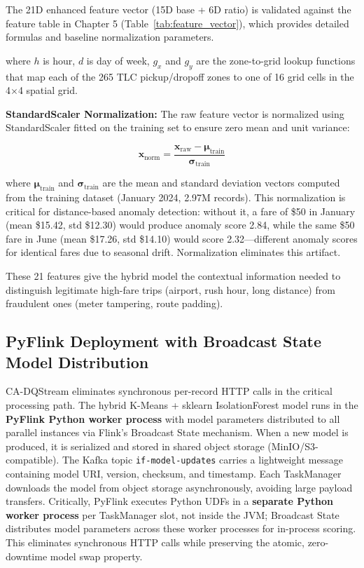 The 21D enhanced feature vector (15D base + 6D ratio) is validated against the feature table in Chapter 5 (Table~\ref{tab:feature_vector}), which provides detailed formulas and baseline normalization parameters.

where $h$ is hour, $d$ is day of week, $g_x$ and $g_y$ are the zone-to-grid lookup functions that map each of the 265 TLC pickup/dropoff zones to one of 16 grid cells in the 4$\times$4 spatial grid.

\textbf{StandardScaler Normalization:} The raw feature vector is normalized using StandardScaler fitted on the training set to ensure zero mean and unit variance:

\begin{equation}
\mathbf{x}_{\text{norm}} = \frac{\mathbf{x}_{\text{raw}} - \boldsymbol{\mu}_{\text{train}}}{\boldsymbol{\sigma}_{\text{train}}}
\end{equation}

where $\boldsymbol{\mu}_{\text{train}}$ and $\boldsymbol{\sigma}_{\text{train}}$ are the mean and standard deviation vectors computed from the training dataset (January 2024, 2.97M records). This normalization is critical for distance-based anomaly detection: without it, a fare of \$50 in January (mean \$15.42, std \$12.30) would produce anomaly score 2.84, while the same \$50 fare in June (mean \$17.26, std \$14.10) would score 2.32---different anomaly scores for identical fares due to seasonal drift. Normalization eliminates this artifact.

These 21 features give the hybrid model the contextual information needed to distinguish legitimate high-fare trips (airport, rush hour, long distance) from fraudulent ones (meter tampering, route padding).

\subsection{PyFlink Deployment with Broadcast State Model Distribution}

CA-DQStream eliminates synchronous per-record HTTP calls in the critical processing path. The hybrid K-Means + sklearn IsolationForest model runs in the \textbf{PyFlink Python worker process} with model parameters distributed to all parallel instances via Flink's Broadcast State mechanism. When a new model is produced, it is serialized and stored in shared object storage (MinIO/S3-compatible). The Kafka topic \texttt{if-model-updates} carries a lightweight message containing model URI, version, checksum, and timestamp. Each TaskManager downloads the model from object storage asynchronously, avoiding large payload transfers. Critically, PyFlink executes Python UDFs in a \textbf{separate Python worker process} per TaskManager slot, not inside the JVM; Broadcast State distributes model parameters across these worker processes for in-process scoring. This eliminates synchronous HTTP calls while preserving the atomic, zero-downtime model swap property.

